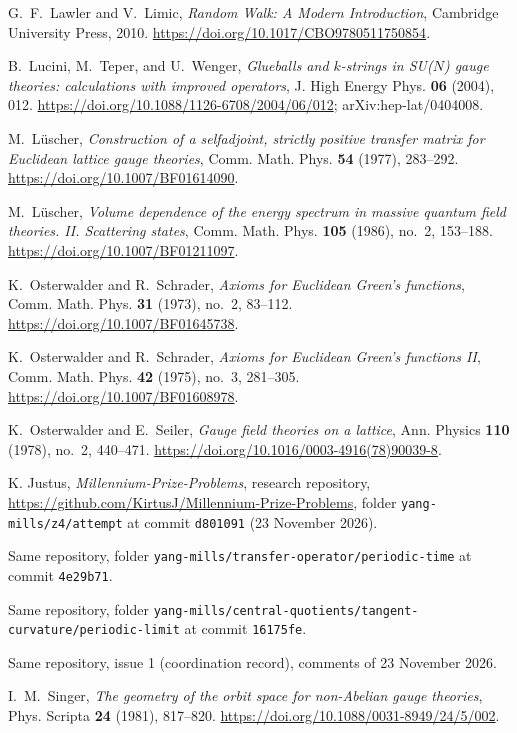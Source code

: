 G.~F.~Lawler and V.~Limic, \emph{Random Walk: A Modern Introduction},
Cambridge University Press, 2010.
\url{https://doi.org/10.1017/CBO9780511750854}.

B.~Lucini, M.~Teper, and U.~Wenger, \emph{Glueballs and $k$-strings in SU($N$) gauge theories: calculations with improved operators},
J. High Energy Phys. \textbf{06} (2004), 012.
\url{https://doi.org/10.1088/1126-6708/2004/06/012}; arXiv:hep-lat/0404008.

M.~L\"uscher, \emph{Construction of a selfadjoint, strictly positive transfer matrix for Euclidean lattice gauge theories},
Comm. Math. Phys. \textbf{54} (1977), 283--292.
\url{https://doi.org/10.1007/BF01614090}.

M.~L\"uscher, \emph{Volume dependence of the energy spectrum in massive quantum field theories. II. Scattering states},
Comm. Math. Phys. \textbf{105} (1986), no.~2, 153--188.
\url{https://doi.org/10.1007/BF01211097}.

K.~Osterwalder and R.~Schrader, \emph{Axioms for Euclidean Green's functions},
Comm. Math. Phys. \textbf{31} (1973), no.~2, 83--112.
\url{https://doi.org/10.1007/BF01645738}.

K.~Osterwalder and R.~Schrader, \emph{Axioms for Euclidean Green's functions II},
Comm. Math. Phys. \textbf{42} (1975), no.~3, 281--305.
\url{https://doi.org/10.1007/BF01608978}.

K.~Osterwalder and E.~Seiler, \emph{Gauge field theories on a lattice},
Ann. Physics \textbf{110} (1978), no.~2, 440--471.
\url{https://doi.org/10.1016/0003-4916(78)90039-8}.

 K. Justus, \emph{Millennium-Prize-Problems}, research repository, \url{https://github.com/KirtusJ/Millennium-Prize-Problems}, folder \texttt{yang-mills/z4/attempt} at commit \texttt{d801091} (23 November 2026).

 Same repository, folder \texttt{yang-mills/transfer-operator/periodic-time} at commit \texttt{4e29b71}.

 Same repository, folder \texttt{yang-mills/central-quotients/tangent-curvature/periodic-limit} at commit \texttt{16175fe}.

 Same repository, issue 1 (coordination record), comments of 23 November 2026.

I.~M.~Singer, \emph{The geometry of the orbit space for non-Abelian gauge theories},
Phys. Scripta \textbf{24} (1981), 817--820.
\url{https://doi.org/10.1088/0031-8949/24/5/002}.

